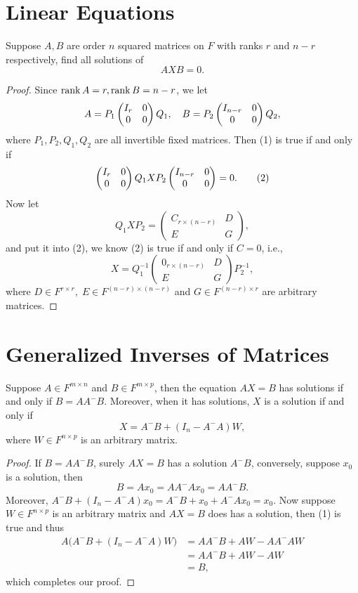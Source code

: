 \section{Linear Equations}
\begin{pro}%
	Suppose $A,B$ are order $n$ squared matrices on $F$ with ranks $r$ and $n-r$ respectively, find all solutions of 
	\[AXB=0.\tag{1}\]
\end{pro}
\begin{proof}
	Since $\operatorname*{rank} A=r,\operatorname*{rank} B=n-r$, we let
	\[A=P_1\begin{pmatrix} I_{r}& 0\\ 0 & 0 \end{pmatrix} Q_1,\quad B=P_2\begin{pmatrix} I_{n-r}& 0\\ 0 & 0 \end{pmatrix} Q_2,\]
	where $P_1,P_2,Q_1,Q_2$ are all invertible fixed matrices. Then (1) is true if and only if
	\[\begin{pmatrix} I_{r}& 0\\ 0 & 0 \end{pmatrix}Q_1XP_2\begin{pmatrix} I_{n-r}& 0\\ 0 & 0 \end{pmatrix}=0.\tag{2}\]
	Now let 
	\[Q_1XP_2=\begin{pmatrix} C_{r\times (n-r)}& D\\ E& G\end{pmatrix},\]
	and put it into (2), we know (2) is true if and only if $C=0$, i.e.,
	\[X=Q_1^{-1}\begin{pmatrix} 0_{r\times (n-r)}& D\\ E& G\end{pmatrix}P_2^{-1},\]
	where $D\in F^{r\times r},\; E\in F^{(n-r)\times (n-r)}$ and $G\in F^{(n-r)\times r}$ are arbitrary matrices.
\end{proof}
\section{Generalized Inverses of Matrices}
\begin{pro}%
	Suppose $A\in F^{m\times n}$ and $B\in F^{m\times p}$, then the equation $AX=B$ has solutions if and only if $B=AA^- B$. Moreover, when it has solutions, $X$ is a solution if and only if
	\[X=A^-B+(I_n-A^-A)W,\]
	where $W\in F^{n\times p}$ is an arbitrary matrix.
\end{pro}
\begin{proof}
	If $B=AA^-B$, surely $AX=B$ has a solution $A^-B$, conversely, suppose $x_0$ is a solution, then
	\[B=Ax_0=AA^-A x_0=AA^- B.\tag{1}\]
	Moreover, $A^-B+(I_n-A^-A)x_0=A^-B+x_0+A^-Ax_0=x_0$. Now suppose $W\in  F^{n\times p}$ is an arbitrary matrix and $AX=B$ does has a solution, then (1) is true and thus
	\begin{align*}
	A\big(A^-B+(I_n-A^-A)W\big)&=AA^-B+AW-AA^-AW\\
							   &=AA^-B+AW-AW\\
							   &=B,
	\end{align*}
	which completes our proof.
\end{proof}

